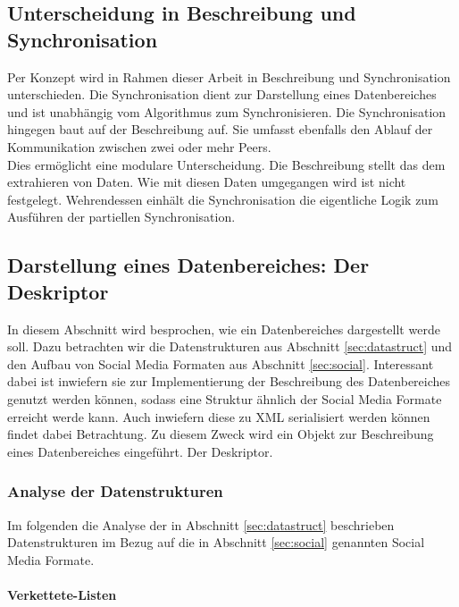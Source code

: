 \documentclass[a4paper]{article}
\begin{document}
	\subsection{Unterscheidung in Beschreibung und Synchronisation}
	
	Per Konzept wird in Rahmen dieser Arbeit in Beschreibung und Synchronisation
	unterschieden. Die Synchronisation dient zur Darstellung eines Datenbereiches
	und ist unabhängig vom Algorithmus zum Synchronisieren. Die Synchronisation
	hingegen baut auf der Beschreibung auf. Sie  umfasst ebenfalls den Ablauf
	der Kommunikation zwischen zwei oder mehr Peers. \\
	
	Dies ermöglicht eine modulare Unterscheidung. Die Beschreibung stellt das  
	dem extrahieren von Daten. Wie mit diesen Daten umgegangen wird ist nicht
	festgelegt. Wehrendessen einhält die Synchronisation die eigentliche Logik zum
	Ausführen der partiellen Synchronisation. 	
	
	\subsection{Darstellung eines Datenbereiches: Der Deskriptor}
	
	In diesem Abschnitt wird besprochen, wie ein Datenbereiches dargestellt werde
	soll. Dazu betrachten wir die Datenstrukturen aus Abschnitt
	\ref{sec:datastruct} und den Aufbau von Social Media Formaten aus Abschnitt
	\ref{sec:social}. Interessant dabei ist inwiefern sie zur Implementierung der
	Beschreibung des Datenbereiches genutzt werden können, sodass eine Struktur
	ähnlich der Social Media Formate erreicht werde kann. Auch inwiefern
	diese zu XML serialisiert werden können findet dabei Betrachtung. Zu diesem
	Zweck wird ein Objekt zur Beschreibung eines Datenbereiches eingeführt. Der
	Deskriptor. 
	
	\subsubsection{Analyse der Datenstrukturen}
	
	Im folgenden die Analyse der in  Abschnitt \ref{sec:datastruct} beschrieben
	Datenstrukturen im Bezug auf die in Abschnitt \ref{sec:social} genannten
	Social Media Formate.
	
	\paragraph{Verkettete-Listen}\mbox{} \\
	
\end{document}
